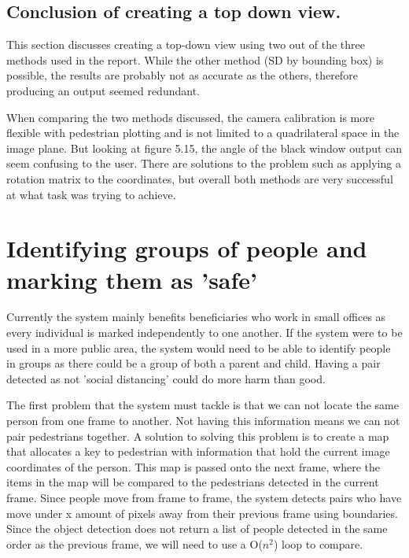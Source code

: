 \documentclass[12pt]{report}
\begin{document}
\subsection{Conclusion of creating a top down view.}

This section discusses creating a top-down view using two out of the three methods used in the report. While the other method (SD by bounding box) is possible, the results are probably not as accurate as the others, therefore producing an output seemed redundant.

\vspace{2mm}

When comparing the two methods discussed, the camera calibration is more flexible with pedestrian plotting and is not limited to a quadrilateral space in the image plane. But looking at figure 5.15, the angle of the black window output can seem confusing to the user. There are solutions to the problem such as applying a rotation matrix to the coordinates, but overall both methods are very successful at what task was trying to achieve.

\section{Identifying groups of people and marking them as ’safe’}

Currently the system mainly benefits beneficiaries who work in small offices as every individual is marked independently to one another. If the system were to be used in a more public area, the system would need to be able to identify people in groups as there could be a group of both a parent and child. Having a pair detected as not 'social distancing' could do more harm than good.

\vspace{2mm}

The first problem that the system must tackle is that we can not locate the same person from one frame to another. Not having this information means we can not pair pedestrians together. A solution to solving this problem is to create a map that allocates a key to pedestrian with information that hold the current image coordinates of the person. This map is passed onto the next frame, where the items in the map will be compared to the pedestrians detected in the current frame. Since people move from frame to frame, the system detects pairs who have move under x amount of pixels away from their previous frame using boundaries. Since the object detection does not return a list of people detected in the same order as the previous frame, we will need to use a  O($n^2$) loop to compare.
\vspace{2mm}
\end{document}
